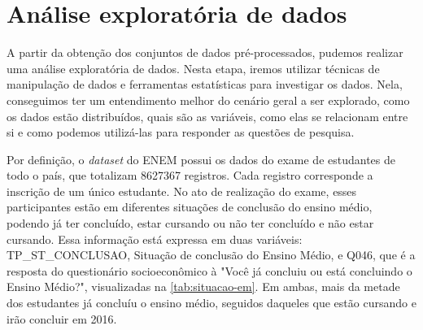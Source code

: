 \section{Análise exploratória de dados}

A partir da obtenção dos conjuntos de dados pré-processados, pudemos realizar uma análise exploratória de dados. Nesta etapa, iremos utilizar técnicas de manipulação de dados e ferramentas estatísticas para investigar os dados. Nela, conseguimos ter um entendimento melhor do cenário geral a ser explorado, como os dados estão distribuídos, quais são as variáveis, como elas se relacionam entre si e como podemos utilizá-las para responder as questões de pesquisa.

Por definição, o \textit{dataset} do ENEM possui os dados do exame de estudantes de todo o país, que totalizam 8627367 registros. Cada registro corresponde a inscrição de um único estudante. No ato de realização do exame, esses participantes estão em diferentes situações de conclusão do ensino médio, podendo já ter concluído, estar cursando ou não ter concluído e não estar cursando. Essa informação está expressa em duas variáveis: TP\_ST\_CONCLUSAO, Situação de conclusão do Ensino Médio, e Q046, que é a resposta do questionário socioeconômico à "Você já concluiu ou está concluindo o Ensino Médio?", visualizadas na \autoref{tab:situacao-em}. Em ambas, mais da metade dos estudantes já concluíu o ensino médio, seguidos daqueles que estão cursando e irão concluir em 2016.

